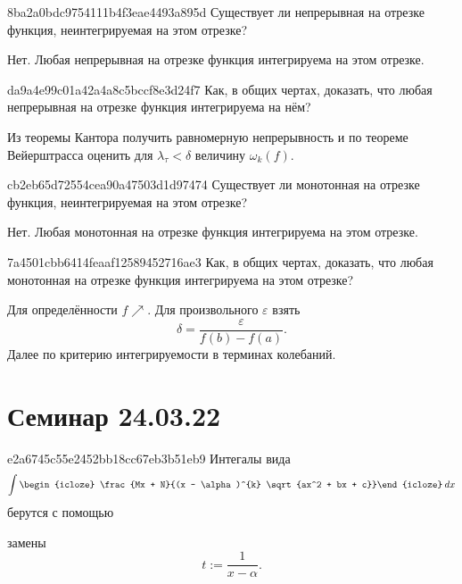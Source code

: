 \begin{note}{8ba2a0bdc9754111b4f3eae4493a895d}
    Существует ли непрерывная на отрезке функция, неинтегрируемая на этом отрезке?

    \begin{cloze}{1}
        Нет. Любая непрерывная на отрезке функция интегрируема на этом отрезке.
    \end{cloze}
\end{note}

\begin{note}{da9a4e99c01a42a4a8c5bccf8e3d24f7}
    Как, в общих чертах, доказать, что любая непрерывная на отрезке функция интегрируема на нём?

    \begin{cloze}{1}
        Из теоремы Кантора получить равномерную непрерывность и по теореме Вейерштрасса оценить для \({ \lambda_\tau < \delta }\) величину \({ \omega_k(f) }\).
    \end{cloze}
\end{note}

\begin{note}{cb2eb65d72554cea90a47503d1d97474}
    Существует ли монотонная на отрезке функция, неинтегрируемая на этом отрезке?

    \begin{cloze}{1}
        Нет. Любая монотонная на отрезке функция интегрируема на этом отрезке.
    \end{cloze}
\end{note}

\begin{note}{7a4501cbb6414feaaf12589452716ae3}
    Как, в общих чертах, доказать, что любая монотонная на отрезке функция интегрируема на этом отрезке?

    \begin{cloze}{1}
        Для определённости \({ f \!\!\nearrow }\). Для произвольного \({ \varepsilon }\) взять
        \[
            \delta = \frac{\varepsilon}{f(b) - f(a)}.
        \]
        Далее по критерию интегрируемости в терминах колебаний.
    \end{cloze}
\end{note}

\section{Семинар 24.03.22}
\begin{note}{e2a6745c55e2452bb18cc67eb3b51eb9}
    Интегалы вида
    \[
        \int \begin{icloze}{2}\frac{Mx + N}{(x - \alpha)^{k} \sqrt{ax^2 + bx + c}}\end{icloze}\: dx
    \]
    берутся с помощью
    \begin{icloze}{1}замены
        \[
            t := \frac{1}{x - \alpha}.
        \]
    \end{icloze}
\end{note}

